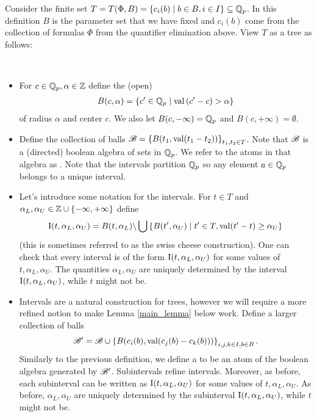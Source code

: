 \documentclass{amsart}
\begin{document}
Consider the finite set $T = T(\Phi, B) = \left\{c_i(b) \mid b \in B, i \in I\right\} \subseteq \mathbb{Q}_p$.
In this definition $B$ is the parameter set that we have fixed 
and $c_i(b)$ come from the collection of formulas $\Phi$ from the quantifier elimination above.
View $T$ as a tree as follows:
\begin{Definition} \ 
  \begin{itemize}
  \item For $c \in \mathbb{Q}_p, \alpha \in \mathbb{Z}$  define the (open)  
    \begin{align*}
      B(c, \alpha) = \left\{c' \in \mathbb{Q}_p \mid \operatorname{val} \left(c' - c\right) > \alpha\right\}
    \end{align*}
    of radius $\alpha$ and center $c$.
    We also let $B(c, -\infty) = \mathbb{Q}_p$ and $B(c, +\infty) = \emptyset$.
  \item Define the collection of balls $\mathscr B = \left\{B(t_1, \operatorname{val}(t_1 - t_2))\right\}_{t_1, t_2 \in T}$.
    Note that $\mathscr B$ is a (directed) boolean algebra of sets in $\mathbb{Q}_p$.
    We refer to the atoms in that algebra as \defn{intervals}.
    Note that the intervals partition $\mathbb{Q}_p$ so any element $a \in \mathbb{Q}_p$ belongs to a unique interval.
  \item Let's introduce some notation for the intervals.
    For $t \in T$ and $\alpha_L, \alpha_U \in \mathbb{Z} \cup \left\{-\infty, +\infty\right\}$ define
    \begin{align*}
      \operatorname{I}(t, \alpha_L, \alpha_U) = B(t, \alpha_L) \backslash \bigcup \left\{B(t', \alpha_U) \mid t' \in T, \operatorname{val}(t' - t) \geq \alpha_U\right\}
    \end{align*}
    (this is sometimes referred to as the swiss cheese construction).
    One can check that every interval is of the form $\operatorname{I}(t, \alpha_L, \alpha_U)$ for some values of $t, \alpha_L, \alpha_U$.
    The quantities $\alpha_L, \alpha_U$ are uniquely determined by the interval $\operatorname{I}(t, \alpha_L, \alpha_U)$,
    while $t$ might not be.
  \item Intervals are a natural construction for trees, however we will require a more refined notion to make Lemma \ref{main_lemma} below work.
    Define a larger collection of balls 
    \begin{align*}
      \mathscr B' = \mathscr B \cup \left\{B(c_i(b), \operatorname{val}(c_j(b) - c_k(b)))\right\}_{i,j,k \in I, b \in B}.  
    \end{align*}
    Similarly to the previous definition, we define a  to be an atom of the boolean algebra generated by $\mathscr B'$.
    Subintervals refine intervals.
    Moreover, as before, each subinterval can be written as $\operatorname{I}(t, \alpha_L, \alpha_U)$ for some values of $t, \alpha_L, \alpha_U$.
    As before, $\alpha_L, \alpha_U$ are uniquely determined by the subinterval $\operatorname{I}(t, \alpha_L, \alpha_U)$,
    while $t$ might not be.
  \end{itemize}
\end{Definition}
\end{document}
